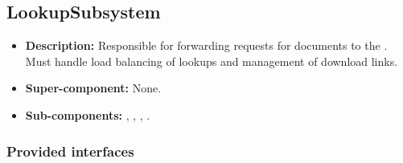 \subsection{LookupSubsystem}
\begin{itemize}
    \item \textbf{Description:} Responsible for forwarding requests for documents to the . Must handle load balancing of lookups and management of download links.
    \item \textbf{Super-component:} None.
    \item \textbf{Sub-components:}  , , , .
\end{itemize}

\subsubsection*{Provided interfaces}
